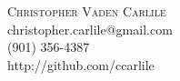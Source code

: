 \documentclass[10pt]{article}
\newenvironment{changemargin}[2]{%
  \begin{list}{}{%
    \setlength{\topsep}{0pt}%
    \setlength{\leftmargin}{#1}%
    \setlength{\rightmargin}{#2}%
    \setlength{\listparindent}{\parindent}%
    \setlength{\itemindent}{\parindent}%
    \setlength{\parsep}{\parskip}%
  }%
  \item[]}{\end{list}
}
\newcommand{\contact}[4]{
	\begin{changemargin}{-0.5in}{-0.5in}
		\begin{center}
			{\Large \textsc {#1}}\\ \smallskip
			{#2}\\ \smallskip 
			{#3}\\ \smallskip
			{#4}\smallskip
		\end{center}
	\end{changemargin}
}
\begin{document}
\begin{comment}
{ \center
{\Large \textsc{Christopher Vaden Carlile}} \\
530 Summitt St. \\
Memphis, TN 38104 \\
christopher.carlile@gmail.com \\
901-356-4387 \\ \bigskip{}
}

{ \raggedright
\today
\bigskip{}

Mr. Mike O'Hearn \\
Lokion \\
\bigskip

Dear Mr. O'Hearn, \\ 
\ \ \ \ I am friends with your wife Chloe through the flow arts scene here in Memphis. She recently posted on Facebook an article about alternative workspaces here, and your company, Lokion, was featured. Lokion's attitude toward employee freedom and individuality resonates with me deeply, and employers who go out of the way to look after their employees the way Lokion does is truly an ideal I just don't see enough of. That you offer facilities for, and encourage cycling is rare in Memphis but critical to me. Seeing Lokion's emphasis on community and collaboration compelled me to apply. \\
\ \ \ \ It's very fortunate, I think, that I found your company at this time. I'm currently a non-degree seeking graduate student at the University of Memphis, working toward a certificate in Cognitive Science. I initially was trying to get research experience in hopes of applying for a Ph.D., but I am now convinced that academia is not for me. I believe my next step is honing my skills as a programmer, and my skillset lines up with what is required for the Entry-Level C\# Developer position currently posted on Lokion's page. \\
\ \ \ \ I've been familiar with C/C++ since I took several CS classes as an undergrad, and the transition to C\# has been pretty natural. I'm very much used to working on a team, and my experience working at Adobe showed me what that looks like in the context of software development. I picked up some very useful QA skills there, as well. Regardless, I'm confident in my ability to learn new technologies, and as a lifelong computer enthusiast I see this as a process that never stops, only grows. Attached is my r\'{e}sum\'{e, and if you have any questions please don't hesitate to get in touch. I look forward to hearing from you soon.
}
{
 \\
\bigskip{} \\
Sincerely, \\
\bigskip{} \\
Chris Carlile
}

\newpage{}
\pagenumbering{gobble}
\end{comment}
\contact{Christopher Vaden Carlile}{christopher.carlile@gmail.com}{(901) 356-4387}{http://github.com/ccarlile}
\end{document}
